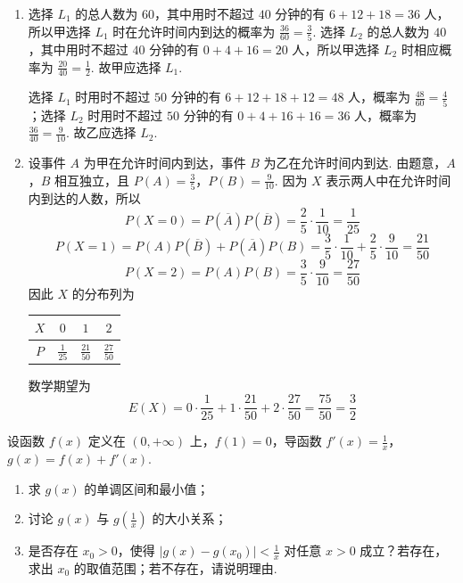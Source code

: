 \begin{solution}
\begin{enumerate}
\item 选择 \(L_1\) 的总人数为 \(60\)，其中用时不超过 \(40\) 分钟的有 \(6+12+18=36\) 人，所以甲选择 \(L_1\) 时在允许时间内到达的概率为 \(\frac{36}{60}=\frac{3}{5}\). 选择 \(L_2\) 的总人数为 \(40\)，其中用时不超过 \(40\) 分钟的有 \(0+4+16=20\) 人，所以甲选择 \(L_2\) 时相应概率为 \(\frac{20}{40}=\frac{1}{2}\). 故甲应选择 \(L_1\).

选择 \(L_1\) 时用时不超过 \(50\) 分钟的有 \(6+12+18+12=48\) 人，概率为 \(\frac{48}{60}=\frac{4}{5}\)；选择 \(L_2\) 时用时不超过 \(50\) 分钟的有 \(0+4+16+16=36\) 人，概率为 \(\frac{36}{40}=\frac{9}{10}\). 故乙应选择 \(L_2\).
\item 设事件 \(A\) 为甲在允许时间内到达，事件 \(B\) 为乙在允许时间内到达. 由题意，\(A\)，\(B\) 相互独立，且 \(P(A)=\frac{3}{5}\)，\(P(B)=\frac{9}{10}\). 因为 \(X\) 表示两人中在允许时间内到达的人数，所以
\[
P(X=0)=P(\overline{A})P(\overline{B})=\frac{2}{5}\cdot\frac{1}{10}=\frac{1}{25}
\]
\[
P(X=1)=P(A)P(\overline{B})+P(\overline{A})P(B)=\frac{3}{5}\cdot\frac{1}{10}+\frac{2}{5}\cdot\frac{9}{10}=\frac{21}{50}
\]
\[
P(X=2)=P(A)P(B)=\frac{3}{5}\cdot\frac{9}{10}=\frac{27}{50}
\]
因此 \(X\) 的分布列为
\begin{center}
\begin{tabular}{c|ccc}
\hline
\(X\) & \(0\) & \(1\) & \(2\) \\
\hline
\(P\) & \(\frac{1}{25}\) & \(\frac{21}{50}\) & \(\frac{27}{50}\) \\
\hline
\end{tabular}
\end{center}
数学期望为
\[
E(X)=0\cdot\frac{1}{25}+1\cdot\frac{21}{50}+2\cdot\frac{27}{50}=\frac{75}{50}=\frac{3}{2}
\]
\end{enumerate}
\end{solution}

\begin{problem}
设函数 \(f(x)\) 定义在 \((0, +\infty)\) 上，\(f(1) = 0\)，导函数 \(f'(x) = \frac{1}{x}\)，\(g(x) = f(x) + f'(x)\).
\begin{enumerate}
\item 求 \(g(x)\) 的单调区间和最小值；
\item 讨论 \(g(x)\) 与 \(g\left(\frac{1}{x}\right)\) 的大小关系；
\item 是否存在 \(x_0 > 0\)，使得 \(|g(x) - g(x_0)| < \frac{1}{x}\) 对任意 \(x > 0\) 成立？若存在，求出 \(x_0\) 的取值范围；若不存在，请说明理由.
\end{enumerate}
\end{problem}

